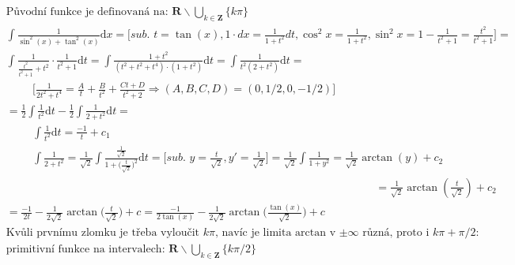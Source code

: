 \documentclass[a4paper]{article}
\newcommand{\dx}{\text{d}x}
\newcommand{\dt}{\text{d}t}
\begin{document}
\vspace{-4cm}
{\fontsize{12}{15}\selectfont \hspace{-0.5cm}}

\section{}
\begin{align*}
	& \text{Původní funkce je definovaná na: } \mathbf{R} \backslash \bigcup_{k\in \mathbf{Z}} \{ k\pi \} \\
	& \int \frac{1}{\sin^2(x)+ \tan^2(x)} \dx = \bigg[\textit{sub. } t = \tan(x), 1\cdot dx = \frac{1}{1+t^2} dt, \cos^2 x = \frac{1}{1+t^2}, \sin^2 x = 1-\frac{1}{t^2+1}=\frac{t^2}{t^2+1} \bigg] = \\
	& \int \frac{1}{\frac{t^2}{t^2+1} + t^2 } \cdot \frac{1}{t^2+1} \dt = \int \frac{1+t^2}{(t^2 + t^2 + t^4)\cdot (1+t^2)} \dt = \int \frac{1}{t^2(2+t^2)} \dt = \\
	& \hspace{1cm} \bigg[ \frac{1}{2t^2 + t^4}  = \frac{A}{t} + \frac{B}{t^2} + \frac{Ct+D}{t^2+2} \Rightarrow (A, B, C, D) = (0, 1/2, 0, -1/2) \bigg]\\
	& = \frac{1}{2} \int \frac{1}{t^2} \dt - \frac{1}{2} \int \frac{1}{2+t^2} \dt = \\
	& \hspace{1cm} \int \frac{1}{t^2} \dt = \frac{-1}{t} + c_1 \\
	& \hspace{1cm} \int \frac{1}{2+t^2} = \frac{1}{\sqrt{2}} \int \frac{\frac{1}{\sqrt{2}}}{1+\big(\frac{t}{\sqrt{2}}\big)^2} \dt = \bigg[\textit{sub. } y = \frac{t}{\sqrt{2}}, y' = \frac{1}{\sqrt{2}} \bigg] = \frac{1}{\sqrt{2}} \int \frac{1}{1+ y^2} = \frac{1}{\sqrt{2}} \arctan(y) + c_2 \\
	& \hspace{14cm} = \frac{1}{\sqrt{2}} \arctan(\frac{t}{\sqrt{2}}) + c_2 \\
	& = \frac{-1}{2t} - \frac{1}{2\sqrt{2}} \arctan\Big(\frac{t}{\sqrt{2}}\Big) + c = \frac{-1}{2\tan(x)} - \frac{1}{2\sqrt{2}} \arctan\Big(\frac{\tan(x)}{\sqrt{2}}\Big) + c \\
	& \text{Kvůli prvnímu zlomku je třeba vyloučit $k\pi$, navíc je limita arctan v $\pm \infty$ různá, proto i $k\pi + \pi/2$: } \\
	& \text{primitivní funkce na intervalech: } \mathbf{R} \backslash \bigcup_{k\in \mathbf{Z}} \{ k\pi/2 \}
\end{align*}
\end{document}
